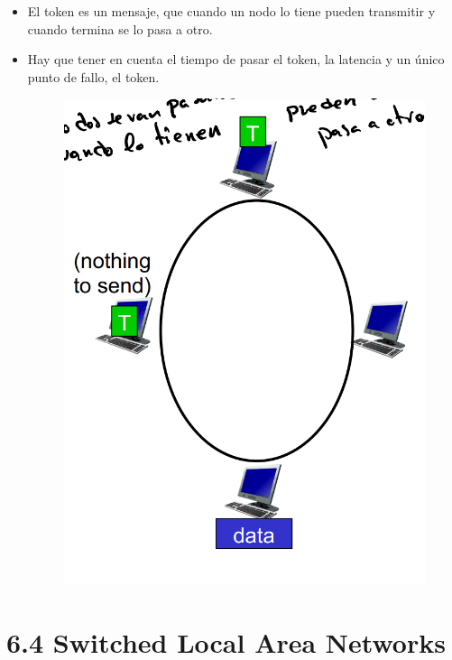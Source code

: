 \documentclass[12pt, twoside, openright]{report} %
\begin{document}
        \begin{itemize}
        \item
          El token es un mensaje, que cuando un nodo lo tiene pueden
          transmitir y cuando termina se lo pasa a otro.
        \item
          Hay que tener en cuenta el tiempo de pasar el token, la
          latencia y un único punto de fallo, el token.
          \begin{figure}[H]
            {\includegraphics[scale=.25]{Untitled 56.png}}
          \end{figure}
        \end{itemize}

\section{6.4 Switched Local Area Networks}
\end{document}
